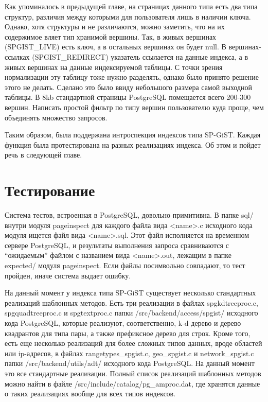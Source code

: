 \documentclass[12pt,oneside]{amsart}
\begin{document}
Как упоминалось в предыдущей главе, на страницах данного типа есть два типа структур, различия между которыми для пользователя лишь в наличии ключа. Однако, хотя структуры и не различаются, можно заметить, что на их содержимое вляет тип хранимой вершины. Так, в живых вершинах (SPGIST\_LIVE) есть ключ, а в остальных вершинах он будет null. В вершинах-ссылках (SPGIST\_REDIRECT) указатель ссылается на данные индекса, а в живых вершинах на данные индексируемой таблицы. С точки зрения нормализации эту таблицу тоже нужно разделять, однако было принято решение этого не делать. Сделано это было ввиду небольшого размера самой выходной таблицы. В 8kb стандартной страницы PostgreSQL помещается всего 200-300 вершин. Написать простой фильтр по типу вершин пользователю куда проще, чем объединять множество запросов.

Таким образом, была поддержана интроспекция индексов типа SP-GiST. Каждая функция была протестирована на разных реализациях индекса. Об этом и пойдет речь в следующей главе.


\section{Тестирование}

Система тестов, встроенная в PostgreSQL, довольно примитивна. В папке sql/ внутри модуля pageinspect для каждого файла вида <name>.c исходного кода модуля ищется файл вида <name>.sql. Этот файл исполняется на временном сервере PostgreSQL, и результаты выполнения запроса сравниваются с ``ожидаемым'' файлом с названием вида <name>.out, лежащим в папке expected/ модуля pageinspect. Если файлы посимвольно совпадают, то тест пройден, иначе система выдает ошибку.

На данный момент у индекса типа SP-GiST существует несколько стандартных реализаций шаблонных методов. Есть три реализации в файлах spgkdtreeproc.c, spgquadtreeproc.c и spgtextproc.c папки /src/backend/access/spgist/ исходного кода PostgreSQL, которые реализуют, соответственно, k-d дерево и дерево квадрантов для типа пары, а также префиксное дерево для строк. Кроме того, есть еще несколько реализаций для более сложных типов данных, вроде областей или ip-адресов, в файлах rangetypes\_spgist.c, geo\_spgist.c и network\_spgist.c папки /src/backend/utils/adt/ исходного кода PostgreSQL. На данный момент это все стандартные реализации. Полный список реализаций шаблонных методов можно найти в файле /src/include/catalog/pg\_amproc.dat, где хранятся данные о таких реализациях вообще для всех типов индексов.
\end{document}
